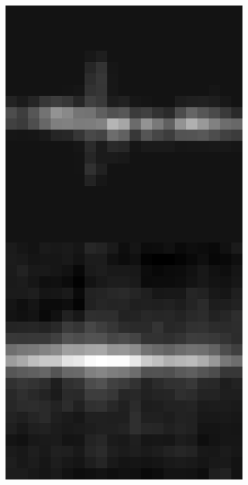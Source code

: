 \documentclass[10pt, letter]{article}
\begin{document}
\begin{figure}[h!]
\begin{subfigure}[t]{0.1\textwidth}
					\includegraphics[width=\textwidth]{figures/inv4}
				\end{subfigure}	
				~
				\begin{subfigure}[t]{0.1\textwidth}
					\centering

\end{subfigure}
\end{figure}
\end{document}
